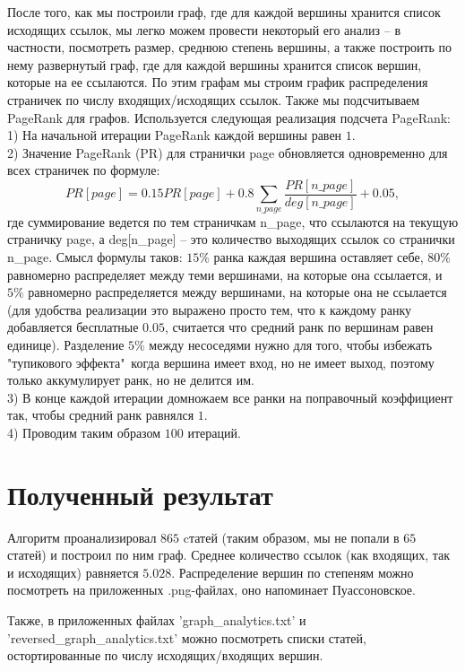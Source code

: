 \documentclass{article}
\begin{document}
\bigskip

После того, как мы построили граф, где для каждой вершины хранится список исходящих ссылок, мы легко можем провести некоторый его анализ -- в частности, посмотреть размер, среднюю степень вершины, а также построить по нему развернутый граф, где для каждой вершины хранится список вершин, которые на ее ссылаются. По этим графам мы строим график распределения страничек по числу входящих/исходящих ссылок. Также мы подсчитываем PageRank для графов. Используется следующая реализация подсчета PageRank:\\
1) На начальной итерации PageRank каждой вершины равен $1$.\\
2)
Значение PageRank (PR) для странички page обновляется одновременно для всех страничек по формуле:
$$
PR[page] = 0.15PR[page] + 0.8 \sum_{n\_page} \frac{PR[n\_page]}{deg[n\_page]} + 0.05,
$$
где суммирование ведется по тем страничкам n\_page, что ссылаются на текущую страничку page, а deg[n\_page] -- это количество выходящих ссылок со странички n\_page.
 Смысл формулы таков: $15\%$ ранка каждая вершина оставляет себе, $80\%$ равномерно распределяет между теми вершинами, на которые она ссылается, и $5\%$ равномерно распределяется между вершинами, на которые она не ссылается (для удобства реализации это выражено просто тем, что к каждому ранку добавляется бесплатные $0.05$, считается что средний ранк по вершинам равен единице). Разделение $5\%$ между несоседями нужно для того, чтобы избежать "тупикового эффекта"\  когда вершина имеет вход, но не имеет выход, поэтому только аккумулирует ранк, но не делится им.\\ 
3) В конце каждой итерации домножаем все ранки на поправочный коэффициент так, чтобы средний ранк равнялся $1$.\\
4) Проводим таким образом $100$ итераций. \\

\section{Полученный результат}

Алгоритм проанализировал $865$ cтатей (таким образом, мы не попали в $65$ статей) и построил по ним граф. Среднее количество ссылок (как входящих, так и исходящих) равняется $5.028$. Распределение вершин по степеням можно посмотреть на приложенных .png-файлах, оно напоминает Пуассоновское.

\bigskip

Также, в приложенных файлах 'graph\_analytics.txt' и 'reversed\_graph\_analytics.txt' можно посмотреть списки статей, остортированные по числу исходящих/входящих вершин. 
\end{document}
